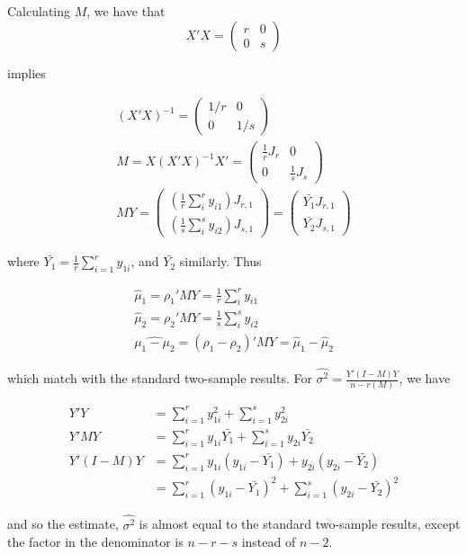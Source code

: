 \documentclass{article}
\begin{document}
Calculating $M$, we have that
\[
X'X = \begin{pmatrix}
r & 0 \\
0 & s \end{pmatrix}
\]

implies

\begin{gather*}
(X'X)^{-1} = \begin{pmatrix}
1/r & 0 \\
0 & 1/s \end{pmatrix} \\
M = X(X'X)^{-1}X' = \begin{pmatrix}
\frac{1}{r} J_{r} & 0 \\
0 & \frac{1}{s} J_{s}
\end{pmatrix} \\
MY = \begin{pmatrix}
\left(\frac{1}{r}\sum_i^r y_{i1}\right)J_{r,1} \\
\left(\frac{1}{s}\sum_i^s y_{i2}\right)J_{s,1}
\end{pmatrix} = 
\begin{pmatrix}
\bar{Y_1}J_{r,1} \\
\bar{Y_2}J_{s,1}
\end{pmatrix}
\end{gather*}

where $\bar{Y_1} = \frac{1}{r}\sum_{i=1}^r y_{1i}$, and $\bar{Y_2}$ similarly. Thus

\begin{gather}
\hat{\mu}_1 = \rho_1'MY = \frac{1}{r}\sum_i^r y_{i1} \\
\hat{\mu}_2 = \rho_2'MY = \frac{1}{s}\sum_i^s y_{i2} \\
\widehat{\mu_1-\mu_2} = (\rho_1-\rho_2)'MY = \hat{\mu}_1 - \hat{\mu}_2
\end{gather}

which match with the standard two-sample results. For $\hat{\sigma^2} = \frac{Y'(I-M)Y}{n-r(M)}$, we have

\begin{align*}
Y'Y &= \sum_{i=1}^r y_{1i}^2 + \sum_{i=1}^s y_{2i}^2 \\
Y'MY &= \sum_{i=1}^r y_{1i}\bar{Y_1} + \sum_{i=1}^s y_{2i}\bar{Y_2} \\
Y'(I-M)Y &= \sum_{i=1}^r y_{1i}(y_{1i}-\bar{Y_1}) + y_{2i}(y_{2i}-\bar{Y_2})  \\
&= \sum_{i=1}^r (y_{1i}-\bar{Y_1})^2 + \sum_{i=1}^s (y_{2i}-\bar{Y_2})^2
\end{align*}

and so the estimate, $\hat{\sigma^2}$ is almost equal to the standard two-sample results, except the factor in the denominator is $n-r-s$ instead of $n-2$.
\end{document}
